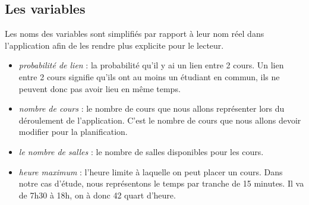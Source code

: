 \documentclass[a4paper,11pt]{article}
\begin{document}
	\subsection{Les variables}
		Les noms des variables sont simplifiés par rapport à leur nom réel dans l'application afin de les rendre plus explicite pour le lecteur.
		\begin{itemize}
			\item \textit{probabilité de lien} : la probabilité qu'il y ai un lien entre 2 cours. Un lien entre 2 cours signifie qu'ils ont au moins un étudiant en commun, ils ne peuvent donc pas avoir lieu en même temps.
			\item \textit{nombre de cours} : le nombre de cours que nous allons représenter lors du déroulement de l'application. C'est le nombre de cours que nous allons devoir modifier pour la planification.
			\item  \textit{le nombre de salles} : le nombre de salles disponibles pour les cours.
			\item \textit{heure maximum} : l'heure limite à laquelle on peut placer un cours. Dans notre cas d'étude, nous représentons le temps par tranche de 15 minutes. Il va de 7h30 à 18h, on à donc 42 quart d'heure.
		\end{itemize}
\end{document}

